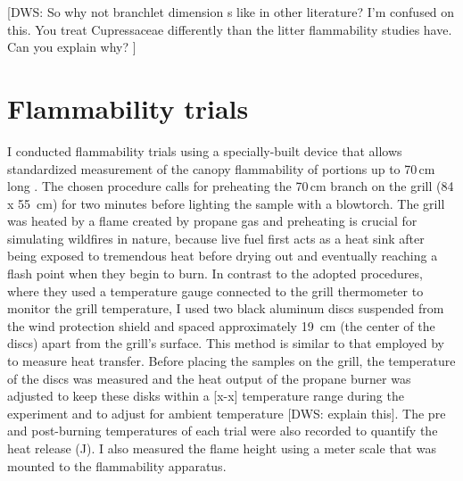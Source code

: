 \documentclass[12pt]{report}
\begin{document}
[DWS: So why not branchlet dimension s like in other literature?  I'm confused on this. You treat Cupressaceae differently than the litter flammability studies have. Can you explain why? ]

\section{Flammability trials}

I conducted flammability trials using a specially-built device that allows standardized measurement of the canopy flammability of portions up to 70\,cm long \citep{jaureguiberry2011device}. The chosen procedure calls for preheating the 70\,cm branch on the grill (84 x 55 \,cm) for two minutes before lighting the sample with a blowtorch. The grill was heated by a flame created by propane gas and preheating is crucial for simulating wildfires in nature, because live fuel first acts as a heat sink after being exposed to tremendous heat before drying out and eventually reaching a flash point when they begin to burn. In contrast to the adopted procedures, where they used a temperature gauge connected to the grill thermometer to monitor the grill temperature, I used two black aluminum discs  suspended from the wind protection shield and spaced approximately 19 \,cm (the center of the discs) apart from the grill's surface. This method is similar to that employed by \citet{gao2022burn} to measure heat transfer. Before placing the samples on the grill, the temperature of the discs was measured and the heat output of the propane burner was adjusted to keep these disks within a [x-x] temperature range during the experiment and to adjust for ambient temperature [DWS: explain this]. The pre and post-burning temperatures of each trial were also recorded to quantify the heat release (J). I also measured the flame height using a meter scale that was mounted to the flammability apparatus.
\end{document}
